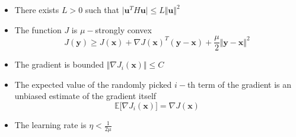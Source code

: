 \documentclass{article}
\numberwithin{equation}{subsection}
\begin{document}
\begin{itemize}
    \item There exists $L > 0$ such that $\vert \textbf{u}^T H \textbf{u} \vert \leq L \Vert \textbf{u} \Vert^2$
    \item The function $J$ is $\mu-$strongly convex
    \begin{equation*}
        J(\textbf{y}) \geq J(\textbf{x}) + \nabla J(\textbf{x})^T(\textbf{y}-\textbf{x}) + \frac{\mu}{2} \Vert \textbf{y}-\textbf{x}\Vert^2
     \end{equation*}
     \item The gradient is bounded $\Vert \nabla J_i(\textbf{x}) \Vert \leq C$
     \item The expected value of the randomly picked $i-$th term of the gradient is an unbiased estimate of the gradient itself
     \begin{equation*}
         \mathbb{E}\big[ \nabla J_i(\textbf{x}) \big] = \nabla J(\textbf{x})
     \end{equation*}
     \item The learning rate is $\eta < \frac{1}{2\mu}$
\end{itemize}
\end{document}
